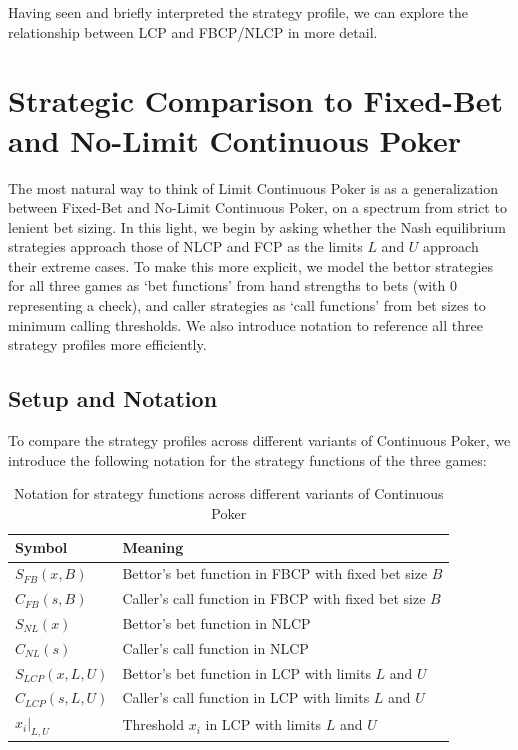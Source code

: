 \documentclass[a4paper,12pt]{article}
\theoremstyle{plain}
\theoremstyle{definition}
\begin{document}
Having seen and briefly interpreted the strategy profile, we can explore the relationship between LCP and FBCP/NLCP in more detail.


\section{Strategic Comparison to Fixed-Bet and No-Limit Continuous Poker}
The most natural way to think of Limit Continuous Poker is as a generalization between Fixed-Bet and No-Limit Continuous Poker, on a spectrum from strict to lenient bet sizing. In this light, we begin by asking whether the Nash equilibrium strategies approach those of NLCP and FCP as the limits $L$ and $U$ approach their extreme cases. To make this more explicit, we model the bettor strategies for all three games as `bet functions' from hand strengths to bets (with 0 representing a check), and caller strategies as `call functions' from bet sizes to minimum calling thresholds. We also introduce notation to reference all three strategy profiles more efficiently.

\subsection{Setup and Notation}

To compare the strategy profiles across different variants of Continuous Poker, we introduce the following notation for the strategy functions of the three games:

\begin{table}[h]
\centering
\begin{tabular}{|l|l|}
\hline
\textbf{Symbol} & \textbf{Meaning} \\
\hline
$S_{FB}(x, B)$ & Bettor's bet function in FBCP with fixed bet size $B$ \\
$C_{FB}(s, B)$ & Caller's call function in FBCP with fixed bet size $B$ \\
$S_{NL}(x)$ & Bettor's bet function in NLCP \\
$C_{NL}(s)$ & Caller's call function in NLCP \\
$S_{LCP}(x, L, U)$ & Bettor's bet function in LCP with limits $L$ and $U$ \\
$C_{LCP}(s, L, U)$ & Caller's call function in LCP with limits $L$ and $U$ \\
$x_i|_{L,U}$ & Threshold $x_i$ in LCP with limits $L$ and $U$ \\
\hline
\end{tabular}
\caption{Notation for strategy functions across different variants of Continuous Poker}
\label{tab:notation}
\end{table}
\end{document}

